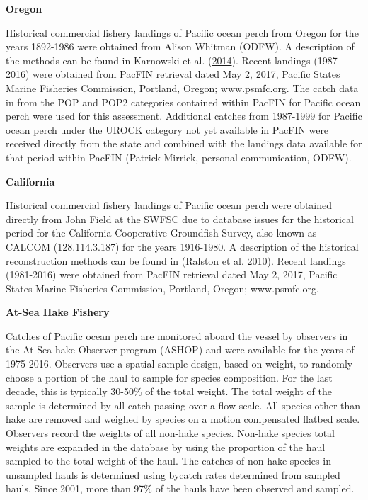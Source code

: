 \documentclass[12pt,]{article}
\begin{document}
\textbf{Oregon}

Historical commercial fishery landings of Pacific ocean perch from
Oregon for the years 1892-1986 were obtained from Alison Whitman (ODFW).
A description of the methods can be found in Karnowski et al.
(\protect\hyperlink{ref-karnowski_historical_2014}{2014}). Recent
landings (1987-2016) were obtained from PacFIN retrieval dated May 2,
2017, Pacific States Marine Fisheries Commission, Portland, Oregon;
www.psmfc.org. The catch data in from the POP and POP2 categories
contained within PacFIN for Pacific ocean perch were used for this
assessment. Additional catches from 1987-1999 for Pacific ocean perch
under the UROCK category not yet available in PacFIN were received
directly from the state and combined with the landings data available
for that period within PacFIN (Patrick Mirrick, personal communication,
ODFW).

\textbf{California}

Historical commercial fishery landings of Pacific ocean perch were
obtained directly from John Field at the SWFSC due to database issues
for the historical period for the California Cooperative Groundfish
Survey, also known as CALCOM (128.114.3.187) for the years 1916-1980. A
description of the historical reconstruction methods can be found in
(Ralston et al.
\protect\hyperlink{ref-ralston_documentation_2010}{2010}). Recent
landings (1981-2016) were obtained from PacFIN retrieval dated May 2,
2017, Pacific States Marine Fisheries Commission, Portland, Oregon;
www.psmfc.org.

\textbf{At-Sea Hake Fishery}

Catches of Pacific ocean perch are monitored aboard the vessel by
observers in the At-Sea hake Observer program (ASHOP) and were available
for the years of 1975-2016. Observers use a spatial sample design, based
on weight, to randomly choose a portion of the haul to sample for
species composition. For the last decade, this is typically 30-50\% of
the total weight. The total weight of the sample is determined by all
catch passing over a flow scale. All species other than hake are removed
and weighed by species on a motion compensated flatbed scale. Observers
record the weights of all non-hake species. Non-hake species total
weights are expanded in the database by using the proportion of the haul
sampled to the total weight of the haul. The catches of non-hake species
in unsampled hauls is determined using bycatch rates determined from
sampled hauls. Since 2001, more than 97\% of the hauls have been
observed and sampled.
\end{document}

